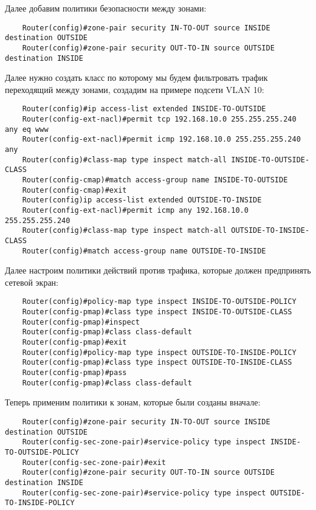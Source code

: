 Далее добавим политики безопасности между зонами:

\begin{lstlisting}
    Router(config)#zone-pair security IN-TO-OUT source INSIDE destination OUTSIDE
    Router(config)#zone-pair security OUT-TO-IN source OUTSIDE destination INSIDE
\end{lstlisting}

Далее нужно создать класс по которому мы будем фильтровать трафик переходящий между зонами, создадим на примере подсети VLAN 10:

\begin{lstlisting}
    Router(config)#ip access-list extended INSIDE-TO-OUTSIDE
    Router(config-ext-nacl)#permit tcp 192.168.10.0 255.255.255.240 any eq www
    Router(config-ext-nacl)#permit icmp 192.168.10.0 255.255.255.240 any
    Router(config)#class-map type inspect match-all INSIDE-TO-OUTSIDE-CLASS
    Router(config-cmap)#match access-group name INSIDE-TO-OUTSIDE
    Router(config-cmap)#exit
    Router(config)ip access-list extended OUTSIDE-TO-INSIDE
    Router(config-ext-nacl)#permit icmp any 192.168.10.0 255.255.255.240
    Router(config)#class-map type inspect match-all OUTSIDE-TO-INSIDE-CLASS
    Router(config)#match access-group name OUTSIDE-TO-INSIDE
\end{lstlisting}

Далее настроим политики действий против трафика, которые должен предпринять сетевой экран:

\begin{lstlisting}
    Router(config)#policy-map type inspect INSIDE-TO-OUTSIDE-POLICY
    Router(config-pmap)#class type inspect INSIDE-TO-OUTSIDE-CLASS
    Router(config-pmap)#inspect
    Router(config-pmap)#class class-default
    Router(config-pmap)#exit
    Router(config)#policy-map type inspect OUTSIDE-TO-INSIDE-POLICY
    Router(config-pmap)#class type inspect OUTSIDE-TO-INSIDE-CLASS
    Router(config-pmap)#pass
    Router(config-pmap)#class class-default
\end{lstlisting}

Теперь применим политики к зонам, которые были созданы вначале:

\begin{lstlisting}
    Router(config)#zone-pair security IN-TO-OUT source INSIDE destination OUTSIDE
    Router(config-sec-zone-pair)#service-policy type inspect INSIDE-TO-OUTSIDE-POLICY
    Router(config-sec-zone-pair)#exit
    Router(config)#zone-pair security OUT-TO-IN source OUTSIDE destination INSIDE
    Router(config-sec-zone-pair)#service-policy type inspect OUTSIDE-TO-INSIDE-POLICY
\end{lstlisting}

